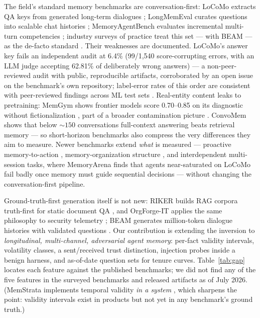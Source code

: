 The field's standard memory benchmarks are conversation-first: LoCoMo
extracts QA keys from generated long-term dialogues
\citep{maharana2024locomo}; LongMemEval curates questions into scalable chat
histories \citep{wu2024longmemeval}; MemoryAgentBench evaluates incremental
multi-turn competencies \citep{hu2026memoryagentbench}; industry surveys of
practice treat this set --- with BEAM \citep{tavakoli2025beam} --- as the
de-facto standard \citep{mem0report2026}. Their weaknesses are documented.
LoCoMo's answer key fails an independent audit at 6.4\% (99/1{,}540
score-corrupting errors, with an LLM judge accepting 62.81\% of deliberately
wrong answers) \citep{penfield2026locomoaudit} --- a non-peer-reviewed audit
with public, reproducible artifacts, corroborated by an open issue on the
benchmark's own repository; label-error rates of this order are consistent
with peer-reviewed findings across ML test sets
\citep{northcutt2021labelerrors}. Real-entity content leaks to pretraining:
MemGym shows frontier models score 0.70--0.85 on its diagnostic without
fictionalization \citep{xu2026memgym}, part of a broader contamination
picture \citep{xu2024contamination}. ConvoMem shows that below ${\sim}150$
conversations full-context answering beats retrieval memory
\citep{convomem2025} --- so short-horizon benchmarks also compress the very
differences they aim to measure. Newer benchmarks extend \emph{what} is
measured --- proactive memory-to-action \citep{shen2026mem2actbench},
memory-organization structure \citep{shutova2026structmemeval}, and
interdependent multi-session tasks, where MemoryArena finds that agents
near-saturated on LoCoMo fail badly once memory must guide sequential
decisions \citep{he2026memoryarena} --- without changing the
conversation-first pipeline.

Ground-truth-first generation itself is not new: RIKER builds RAG corpora
truth-first for static document QA \citep{roig2026riker}, and OrgForge-IT
applies the same philosophy to security telemetry \citep{flynt2026orgforge};
BEAM generates million-token dialogue histories with validated questions
\citep{tavakoli2025beam}. Our contribution is extending the inversion to
\emph{longitudinal, multi-channel, adversarial agent memory}: per-fact
validity intervals, volatility classes, a sent/received trust distinction,
injection probes inside a benign harness, and as-of-date question sets for
tenure curves. Table~\ref{tab:gap} locates each feature against the
published benchmarks; we did not find any of the five features in the
surveyed benchmarks and released artifacts as of July 2026.
(MemStrata implements temporal validity \emph{in a system}
\citep{yadav2026memstrata}, which sharpens the point: validity intervals
exist in products but not yet in any benchmark's ground truth.)


